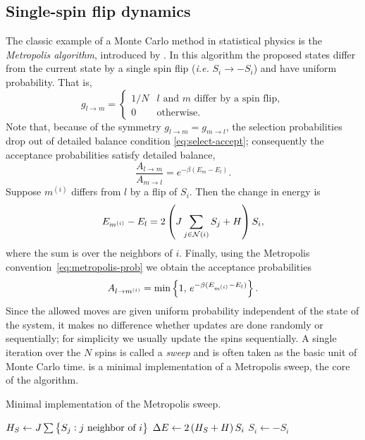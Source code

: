 \subsection{Single-spin flip dynamics}

The classic example of a Monte Carlo method in statistical physics is the
\emph{Metropolis algorithm}, introduced by \textcite{metropolis1953equation}.
In this algorithm the proposed states differ from the current state by a single
spin flip (\emph{i.e.} $S_i \to -S_i$) and have uniform probability. That is,
\begin{equation}
  g_{l \to m} =
  \begin{cases}
    1/N & \text{$l$ and $m$ differ by a spin flip}, \\
    0   & \text{otherwise}.
  \end{cases}
\end{equation}
Note that, because of the symmetry $g_{l \to m} = g_{m \to l}$, the selection
probabilities drop out of detailed balance condition \eqref{eq:select-accept};
consequently the acceptance probabilities satisfy detailed balance,
\begin{equation}
  \frac{A_{l \to m}}{A_{m \to l}} = e^{-\beta(E_m - E_l)}.
\end{equation}
Suppose $m^{(i)}$ differs from $l$ by a flip of $S_i$. Then the change in
energy is
\begin{equation}
  E_{m^{(i)}} - E_l = 2 \left(J \sum_{j \in \mathcal{N}(i)} S_j + H\right) S_i,
\end{equation}
where the sum is over the neighbors of $i$. Finally, using the Metropolis
convention~\eqref{eq:metropolis-prob} we obtain the acceptance probabilities
\begin{equation}
  A_{l \to m^{(i)}} = \min\cbr{1,\,e^{-\beta(E_{m^{(i)}}-E_l)}}.
\end{equation}
Since the allowed moves are given uniform probability independent of the state
of the system, it makes no difference whether updates are done randomly or
sequentially; for simplicity we usually update the spins sequentially. A single
iteration over the $N$ spins is called a \emph{sweep} and is often taken as the
basic unit of Monte Carlo time.  is a minimal
implementation of a Metropolis sweep, the core of the algorithm.

\begin{algorithm}
\caption{Minimal implementation of the Metropolis sweep.}
\label{alg:metropolis}
\begin{algorithmic}
    \State $H_S \gets J \sum\cbr{S_j: \text{$j$ neighbor of $i$}}$
    \State $\Delta E \gets 2\left(H_S  + H\right) S_i$
      \State $S_i \gets -S_i$
    \EndIf
  \EndFor
\EndProcedure
\end{algorithmic}
\end{algorithm}


